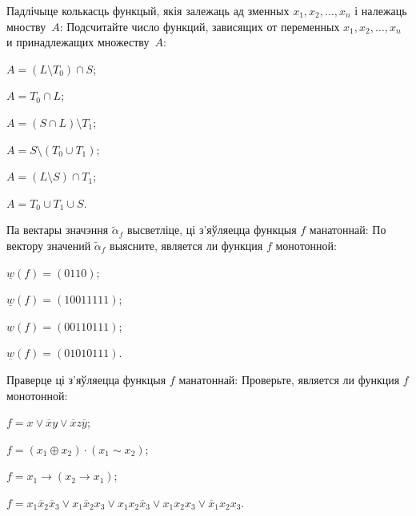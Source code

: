 \documentclass[12pt, a4paper]{article}
\begin{document}
\begin{problemList}
\smallskip

\problemItemWithCommonPart
{Падлічыце колькасць функцый, якія залежаць ад зменных $x_1, x_2, \ldots, x_n$ і належаць мноству~$A$:}
{Подсчитайте число функций, зависящих от переменных $x_1, x_2, \ldots, x_n$ и принадлежащих множеству~$A$:}
{%
\begin{belarusianEnumerateMulticol}
    \item $A=(L\setminus T_0)\cap S$;
    \item $A=T_0\cap L$;
    \item $A=(S\cap L)\setminus T_1$;
    \item $A=S\setminus(T_0\cup T_1)$;
    \item $A=(L\setminus S)\cap T_1$;
    \item $A=T_0 \cup T_1 \cup S$.
\end{belarusianEnumerateMulticol}
}

\smallskip

\problemItemWithCommonPart
{Па вектары значэння $\tilde\alpha_f$ высветліце, ці з'яўляецца функцыя $f$ манатоннай:}
{По вектору значений $\tilde\alpha_f$ выясните, является ли функция $f$ монотонной:}
{%
\begin{belarusianEnumerateMulticol}
    \item $\underline{w}(f)=(0110)$;
    \item $\underline{w}(f)=(10011111)$;
    \item $\underline{w}(f)=(00110111)$;
    \item $\underline{w}(f)=(01010111)$.
\end{belarusianEnumerateMulticol}
}

\smallskip

\problemItemWithCommonPart
{Праверце ці з'яўляецца функцыя $f$ манатоннай:}
{Проверьте, является ли функция $f$ монотонной:}
{%
\begin{belarusianEnumerate}
    \item $f=x\vee \overline{x}y\vee\overline{x}z\overline{y}$;
    \item $f=(x_1\oplus x_2)\cdot(x_1\sim x_2)$;
    \item $f=x_1\rightarrow (x_2 \rightarrow x_1)$;
    \item $f=x_1\overline{x}_2\overline{x}_3\vee x_1\overline{x}_2x_3\vee x_1x_2\overline{x}_3\vee x_1x_2x_3\vee \overline{x}_1x_2x_3$.
\end{belarusianEnumerate}
}

\smallskip


\end{problemList}
\end{document}
